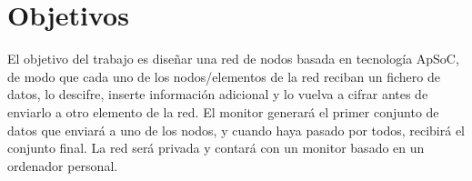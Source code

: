 \section{Objetivos}
El objetivo del trabajo es diseñar una red de nodos basada en tecnología ApSoC, de modo que cada uno de los nodos/elementos de la red reciban un fichero de datos, lo descifre, inserte
información adicional y lo vuelva a cifrar antes de enviarlo a otro elemento de la red. El monitor generará el primer conjunto de datos que enviará a uno de los nodos, y cuando haya
pasado por todos, recibirá el conjunto final. La red será privada y contará con un monitor basado en un ordenador personal.


%
